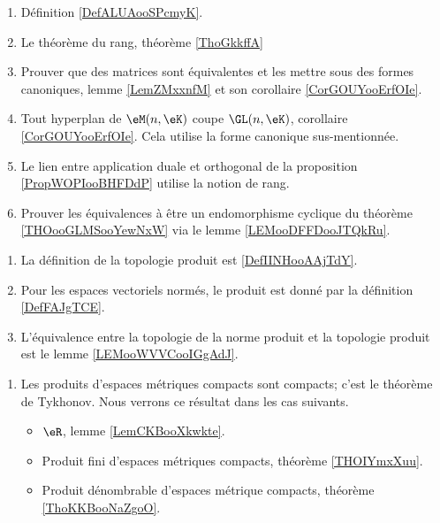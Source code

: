     \begin{enumerate}
        \item Définition \ref{DefALUAooSPcmyK}.
        \item Le théorème du rang, théorème \ref{ThoGkkffA}
        \item Prouver que des matrices sont équivalentes et les mettre sous des formes canoniques, lemme \ref{LemZMxxnfM} et son corollaire \ref{CorGOUYooErfOIe}.
        \item Tout hyperplan de \( \eM(n,\eK)\) coupe \( \GL(n,\eK)\), corollaire \ref{CorGOUYooErfOIe}. Cela utilise la forme canonique sus-mentionnée.
        \item Le lien entre application duale et orthogonal de la proposition \ref{PropWOPIooBHFDdP} utilise la notion de rang.
        \item Prouver les équivalences à être un endomorphisme cyclique du théorème \ref{THOooGLMSooYewNxW} via le lemme \ref{LEMooDFFDooJTQkRu}.
        \end{enumerate}

    \begin{enumerate}
        \item
            La définition de la topologie produit est \ref{DefIINHooAAjTdY}.
        \item
            Pour les espaces vectoriels normés, le produit est donné par la définition \ref{DefFAJgTCE}.
        \item
            L'équivalence entre la topologie de la norme produit et la topologie produit est le lemme \ref{LEMooWVVCooIGgAdJ}.
        \end{enumerate}

    \begin{enumerate}
    \item
        Les produits d'espaces métriques compacts sont compacts; c'est le théorème de Tykhonov. Nous verrons ce résultat dans les cas suivants.
        \begin{itemize}
    \item
         \( \eR\), lemme \ref{LemCKBooXkwkte}.
    \item
        Produit fini d'espaces métriques compacts, théorème \ref{THOIYmxXuu}.
    \item
        Produit dénombrable d'espaces métrique compacts, théorème \ref{ThoKKBooNaZgoO}.
        \end{itemize}
    \end{enumerate}

